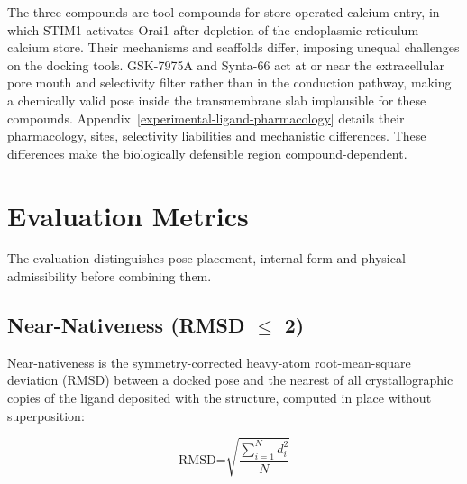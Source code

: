 The three compounds are tool compounds for store-operated calcium entry, in which STIM1 activates Orai1 after depletion of the endoplasmic-reticulum calcium store. Their mechanisms and scaffolds differ, imposing unequal challenges on the docking tools. GSK-7975A and Synta-66 act at or near the extracellular pore mouth and selectivity filter rather than in the conduction pathway, making a chemically valid pose inside the transmembrane slab implausible for these compounds. Appendix~\ref{experimental-ligand-pharmacology} details their pharmacology, sites, selectivity liabilities and mechanistic differences. These differences make the biologically defensible region compound-dependent.

\hypertarget{evaluation-metrics}{%
\section{Evaluation Metrics}\label{evaluation-metrics}}

The evaluation distinguishes pose placement, internal form and physical admissibility before combining them.

\hypertarget{near-nativeness-rmsd-2uxe5}{%
\subsection{\texorpdfstring{Near-Nativeness (RMSD \ensuremath{\leq} 2\angstrom{})}{Near-Nativeness (RMSD <= 2 Angstrom)}}\label{near-nativeness-rmsd-2uxe5}}

Near-nativeness is the symmetry-corrected heavy-atom root-mean-square deviation (RMSD) between a docked pose and the nearest of all crystallographic copies of the ligand deposited with the structure, computed in place without superposition:

\[\text{RMSD=}\sqrt{\frac{\sum_{i = 1}^{N}d_{i}^{\text{2}}}{N}}\]

